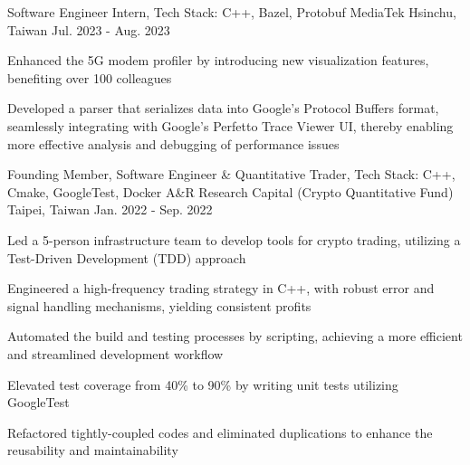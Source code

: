 

\begin{cventries}

  \cventry
    {Software Engineer Intern, \color{awesome} Tech Stack: C++, Bazel, Protobuf} %
    {MediaTek} %
    {Hsinchu, Taiwan} %
    {Jul. 2023 - Aug. 2023} %
    {
      \begin{cvitems} %
        \item {Enhanced the 5G modem profiler by introducing new visualization features, benefiting over 100 colleagues}
        \item {Developed a parser that serializes data into Google's Protocol Buffers format, seamlessly integrating with Google's Perfetto Trace Viewer UI, thereby enabling more effective analysis and debugging of performance issues}
      \end{cvitems}
    }

  \cventry
    {Founding Member, Software Engineer \& Quantitative Trader, \color{awesome} Tech Stack: C++, Cmake, GoogleTest, Docker} %
    {A\&R Research Capital (Crypto Quantitative Fund)} %
    {Taipei, Taiwan} %
    {Jan. 2022 - Sep. 2022} %
    {
      \begin{cvitems} %
        \item Led a 5-person infrastructure team to develop tools for crypto trading, utilizing a Test-Driven Development (TDD) approach
        \item Engineered a high-frequency trading strategy in C++, with robust error and signal handling mechanisms, yielding consistent profits 
        \item Automated the build and testing processes by scripting, achieving a more efficient and streamlined development workflow
        \item Elevated test coverage from 40\% to 90\% by writing unit tests utilizing GoogleTest
        \item Refactored tightly-coupled codes and eliminated duplications to enhance the reusability and maintainability
      \end{cvitems}
    }

\end{cventries}
